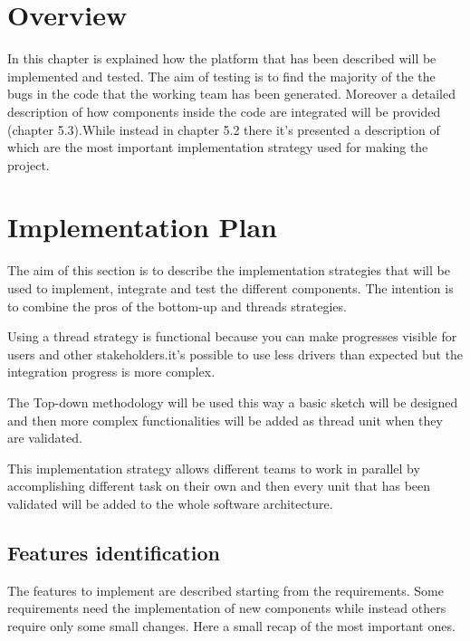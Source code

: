 \section{Overview}
In this chapter is explained how the platform that has been described will be implemented and tested. The aim of testing is to find the majority of the the bugs in the code that the working team has been generated.
Moreover a detailed description of how components inside the code are integrated will be provided (chapter 5.3).While instead in chapter 5.2 there it's presented a description of which are the most important implementation strategy used for making the project.


\section{Implementation Plan}
The aim of this section is to describe the implementation strategies that will be used to implement, integrate and test the different components. The intention is to combine the pros of the bottom-up and threads strategies.

Using a thread strategy is functional because you can make progresses visible for users and other stakeholders.it's possible to use less drivers than expected but the integration progress is more complex.

The Top-down methodology will be used this way a basic sketch will be designed and then more complex functionalities will be added as thread unit when they are validated.

This implementation strategy allows different teams to work in parallel by accomplishing different task on their own and then every unit that has been validated will be added to the whole software architecture.
\pagebreak


\subsection{Features identification}
The features to implement are described starting from the requirements.
Some requirements need the implementation of new components while instead others require only some small changes.
Here a small recap of the most important ones.

